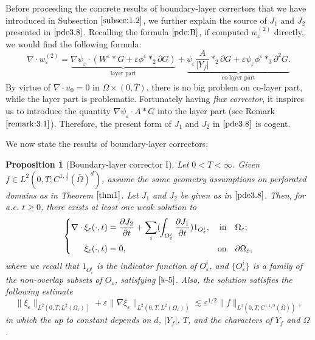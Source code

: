 \documentclass[13pt,CJK]{article}
\theoremstyle{plain}                       %
\newtheorem{proposition}[lemma]{Proposition}
\theoremstyle{remark}
\numberwithin{equation}{section}
\def\Xint#1{\mathchoice
  {\XXint\displaystyle\textstyle{#1}}%
  {\XXint\textstyle\scriptstyle{#1}}%
  {\XXint\scriptstyle\scriptscriptstyle{#1}}%
  {\XXint\scriptscriptstyle\scriptscriptstyle{#1}}%
  \!\int}
\def\XXint#1#2#3{{\setbox0=\hbox{$#1{#2#3}{\int}$}
  \vcenter{\hbox{$#2#3$}}\kern-.5\wd0}}
\def\dashint{\Xint-}
\begin{document}
\noindent
Before proceeding the concrete results of boundary-layer correctors that we have introduced in Subsection $\ref{subsec:1.2}$,
we further explain the source of $J_1$ and $J_2$ presented in  $\eqref{pde3.8}$. Recalling the formula $\eqref{pde:B}$,
if computed $w_\varepsilon^{(2)}$ directly, we would find the following formula:
\begin{equation*}
\nabla \cdot w_\varepsilon^{(2)}
= \underbrace{\nabla\psi_{\varepsilon}\cdot(W^{\varepsilon}\ast G+\varepsilon\phi^{\varepsilon}\ast_2\partial G)}_{\text{layer~part}}
+\underbrace{\psi_{\varepsilon}
\frac{A}{|Y_f|}\ast_2\partial G
+\varepsilon\psi_{\varepsilon}
\phi^{\varepsilon}\ast_3\partial^2G.}_{\text{co-layer~part}}
\end{equation*}
By virtue of $\nabla\cdot u_0 = 0$ in $\Omega\times(0,T)$, there is no big problem on co-layer part, while the layer part is problematic.
Fortunately having \emph{flux corrector}, it inspires us to introduce the quantity $\nabla\psi_\varepsilon\cdot A*G$ into the layer part
(see Remark $\ref{remark:3.1}$). Therefore, the present form of $J_1$ and $J_2$ in $\eqref{pde3.8}$ is cogent.


We now state the results of boundary-layer correctors:

\begin{proposition}[Boundary-layer corrector I]\label{lemma3.6-1}
Let $0<T<\infty$. Given $f\in L^2(0,T;C^{1,\frac{1}{2}}(\bar\Omega)^d)$, assume
the same geometry assumptions on perforated domains as in Theorem
$\ref{thm1}$.
Let $J_1$ and $J_2$ be given as in $\eqref{pde3.8}$. Then, for a.e. $t\geq 0$,
there exists at least
one weak solution to
\begin{equation}\label{divc2}
\left\{
\begin{aligned}
\nabla\cdot\xi_{\varepsilon}(\cdot,t)&=\frac{\partial J_2}{\partial t} +\sum_{i} (\dashint_{O_{\varepsilon}^i}\frac{\partial J_1}{\partial t})1_{O_{\varepsilon}^i},&
\text{in}&\quad \Omega_{\varepsilon};\\
\xi_{\varepsilon}(\cdot,t)&=0,&\text{on}&\quad \partial \Omega_{\varepsilon},
\end{aligned}\right.
\end{equation}
where we recall that $1_{O_{\varepsilon}^i}$ is the indicator function of $O_{\varepsilon}^i$, and $\{O_{\varepsilon}^i\}$ is a family of the non-overlap subsets of $O_\varepsilon$, satisfying $\eqref{k-5}$. Also,
the solution satisfies the following estimate
\begin{equation}\label{pri:4.1}
 \|\xi_{\varepsilon}\|_{L^2(0,T;L^2(\Omega_\varepsilon))}
 + \varepsilon\|\nabla\xi_{\varepsilon}\|_{L^2(0,T;L^2(\Omega_\varepsilon))}
 \lesssim \varepsilon^{1/2}\|f\|_{L^2(0,T;C^{1,1/2}(\bar{\Omega}))},
\end{equation}
in which the up to constant depends on $d$, $|Y_f|$, $T$, and the characters of $Y_f$ and $\Omega$.
\end{proposition}
\end{document}
